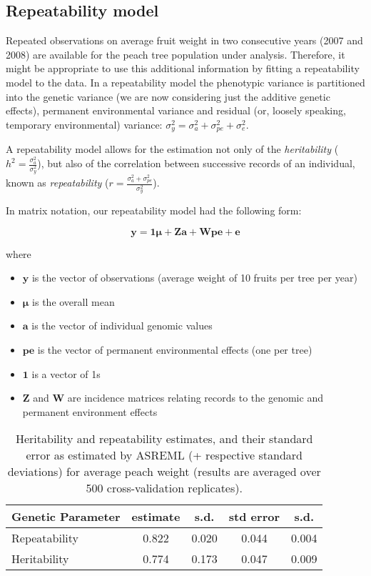 \documentclass[english,11pt,a4paper]{scrartcl}
\begin{document}
\subsection*{Repeatability model}
Repeated observations on average fruit weight in two consecutive years
(2007 and 2008) are available for the peach tree population under
analysis. Therefore, it might be appropriate to use this additional
information by fitting a repeatability model to the data.
In a repeatability model the phenotypic variance is partitioned into
the genetic variance (we are now considering just the additive genetic
effects), permanent
environmental variance and residual (or, loosely speaking,
temporary environmental) variance: $\sigma^2_y=\sigma^2_a+\sigma^2_{pe}+\sigma^2_e$.

A repeatability model allows for the estimation not only of the
\emph{heritability} ($h^2=\frac{\sigma^2_a}{\sigma^2_y}$), but also of the
correlation between successive records of an individual, known as
\emph{repeatability} ($r=\frac{\sigma^2_a+\sigma^2_{pe}}{\sigma^2_y}$). 

In matrix notation, our repeatability model had the following form:

\begin{equation}
\boldsymbol{y}=\boldsymbol{1\mu}+\boldsymbol{Za}+\boldsymbol{Wpe}+\boldsymbol{e}
\end{equation}

where
{\renewcommand\labelitemi{}
\begin{itemize}
\item $\boldsymbol{y}$ is the vector of observations (average weight of 10
  fruits per tree per year)
\item $\boldsymbol{\mu}$ is the overall mean
\item $\boldsymbol{a}$ is the vector of individual genomic values
\item $\boldsymbol{pe}$ is the vector of permanent environmental effects
  (one per tree)
\item $\boldsymbol{1}$ is a vector of 1s
\item $\boldsymbol{Z}$ and $\boldsymbol{W}$ are incidence matrices relating
  records to the genomic and permanent environment effects
\end{itemize}
}



\begin{table}
\centering
\begin{tabular}{l c c c c}
Genetic Parameter & estimate & s.d. & std error & s.d. \\
\hline
Repeatability & 0.822 & 0.020 & 0.044 & 0.004 \\
Heritability & 0.774 & 0.173 & 0.047 & 0.009 \\
\end{tabular}
\caption{Heritability and repeatability estimates, and their standard
  error as estimated by ASREML (+ respective standard
  deviations) for average peach weight (results are averaged over 500 cross-validation replicates).}
\label{tab:repeatability}
\end{table}


\pagebreak



\end{document}
